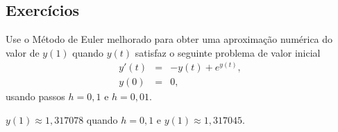 \subsection*{Exercícios}

\begin{exer} Use o Método de Euler melhorado para obter uma aproximação numérica do valor de $y(1)$ quando $y(t)$ satisfaz o seguinte problema de valor inicial
\begin{eqnarray*}
 y'(t)&=&-y(t)+ e^{y(t)},\\
 y(0)&=&0,
\end{eqnarray*}
usando passos $h=0,1$ e $h=0,01$.
\end{exer}
\begin{resp}
  
 $y(1)\approx 1,317078$ quando $h=0,1$ e $y(1)\approx 1,317045$.    
  
\end{resp}


